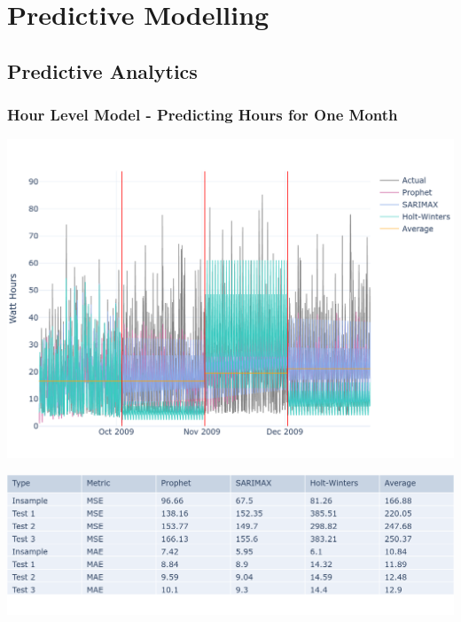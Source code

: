 \documentclass[10pt]{beamer}
\begin{document}
\section{Predictive Modelling}

\subsection{Predictive Analytics}

\begin{frame}
\frametitle{Hour Level Model - Predicting Hours for One Month}

\bigskip
{
    \centering
    \includegraphics[width=\textwidth,height=\textheight,keepaspectratio]{model_comparison_timeseries_hourmodel_hours.png}
    \par
}
\bigskip

\bigskip
{
    \centering
    \includegraphics[width=\textwidth,height=\textheight,keepaspectratio]{model_comparison_table_hourmodel_hours.png}
    \par
}
\bigskip

\end{frame}
\end{document}
